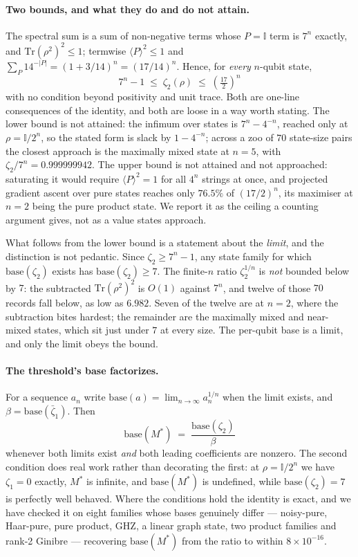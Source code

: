 \paragraph{Two bounds, and what they do and do not attain.}
The spectral sum is a sum of non-negative terms whose \(P = \mathbb{I}\) term is
\(7^n\) exactly, and \(\mathrm{Tr}(\rho^2)^2 \le 1\); termwise
\(\langle P\rangle^2 \le 1\) and \(\sum_P 14^{-|P|} = (1 + 3/14)^n = (17/14)^n\).
Hence, for \emph{every} \(n\)-qubit state,
\[
\boxed{\;7^n - 1 \;\le\; \zeta_2(\rho) \;\le\; \left(\tfrac{17}{2}\right)^{\! n}\;}
\]
with no condition beyond positivity and unit trace. Both are one-line consequences of the
identity, and both are loose in a way worth stating. The lower bound is not attained: the
infimum over states is \(7^n - 4^{-n}\), reached only at \(\rho = \mathbb{I}/2^n\), so the
stated form is slack by \(1 - 4^{-n}\); across a zoo of \(70\) state-size pairs the closest
approach is the maximally mixed state at \(n = 5\), with \(\zeta_2/7^n = 0.999999942\). The
upper bound is not attained and not approached: saturating it would require
\(\langle P\rangle^2 = 1\) for all \(4^n\) strings at once, and projected gradient ascent over
pure states reaches only \(76.5\%\) of \((17/2)^n\), its maximiser at \(n = 2\) being the pure
product state. We report it as the ceiling a counting argument gives, not as a value states
approach.

What follows from the lower bound is a statement about the \emph{limit}, and the distinction
is not pedantic. Since \(\zeta_2 \ge 7^n - 1\), any state family for which
\(\mathrm{base}(\zeta_2)\) exists has \(\mathrm{base}(\zeta_2) \ge 7\). The finite-\(n\) ratio
\(\zeta_2^{1/n}\) is \emph{not} bounded below by \(7\): the subtracted \(\mathrm{Tr}(\rho^2)^2\)
is \(O(1)\) against \(7^n\), and twelve of those \(70\) records fall below, as low as
\(6.982\). Seven of the twelve are at \(n = 2\), where the subtraction bites hardest; the
remainder are the maximally mixed and near-mixed states, which sit just under \(7\) at every
size. The per-qubit base is a limit, and only the limit obeys the bound.

\paragraph{The threshold's base factorizes.}
For a sequence \(a_n\) write \(\mathrm{base}(a) = \lim_{n\to\infty} a_n^{1/n}\) when the limit
exists, and \(\beta = \mathrm{base}(\bar\zeta_1)\). Then
\[
\boxed{\;\mathrm{base}(M^*) \;=\; \frac{\mathrm{base}(\zeta_2)}{\beta}\;}
\]
whenever both limits exist \emph{and} both leading coefficients are nonzero. The second
condition does real work rather than decorating the first: at \(\rho = \mathbb{I}/2^n\) we have
\(\zeta_1 = 0\) exactly, \(M^*\) is infinite, and \(\mathrm{base}(M^*)\) is undefined, while
\(\mathrm{base}(\zeta_2) = 7\) is perfectly well behaved. Where the conditions hold the identity
is exact, and we have checked it on eight families whose bases genuinely differ --- noisy-pure,
Haar-pure, pure product, GHZ, a linear graph state, two product families and rank-2 Ginibre ---
recovering \(\mathrm{base}(M^*)\) from the ratio to within \(8 \times 10^{-16}\).

